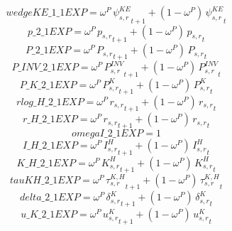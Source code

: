\begin{dmath*}
wedgeKE\_1\_1EXP = {{\omega^{P}}}\, {{\psi^{KE}_{s,r}}}_{t+1}+\left(1-{{\omega^{P}}}\right)\, {{\psi^{KE}_{s,r}}}_{t}
\end{dmath*}
\begin{dmath*}
p\_2\_1EXP = {{\omega^{P}}}\, {{p_{s,r}}}_{t+1}+\left(1-{{\omega^{P}}}\right)\, {{p_{s,r}}}_{t}
\end{dmath*}
\begin{dmath*}
P\_2\_1EXP = {{\omega^{P}}}\, {{P_{s,r}}}_{t+1}+\left(1-{{\omega^{P}}}\right)\, {{P_{s,r}}}_{t}
\end{dmath*}
\begin{dmath*}
P\_INV\_2\_1EXP = {{\omega^{P}}}\, {{P^{INV}_{s,r}}}_{t+1}+\left(1-{{\omega^{P}}}\right)\, {{P^{INV}_{s,r}}}_{t}
\end{dmath*}
\begin{dmath*}
P\_K\_2\_1EXP = {{\omega^{P}}}\, {{P^K_{s,r}}}_{t+1}+\left(1-{{\omega^{P}}}\right)\, {{P^K_{s,r}}}_{t}
\end{dmath*}
\begin{dmath*}
rlog\_H\_2\_1EXP = {{\omega^{P}}}\, {{r_{s,r}}}_{t+1}+\left(1-{{\omega^{P}}}\right)\, {{r_{s,r}}}_{t}
\end{dmath*}
\begin{dmath*}
r\_H\_2\_1EXP = {{\omega^{P}}}\, {{r_{s,r}}}_{t+1}+\left(1-{{\omega^{P}}}\right)\, {{r_{s,r}}}_{t}
\end{dmath*}
\begin{dmath*}
omegaI\_2\_1EXP = 1
\end{dmath*}
\begin{dmath*}
I\_H\_2\_1EXP = {{\omega^{P}}}\, {{I^H_{s,r}}}_{t+1}+\left(1-{{\omega^{P}}}\right)\, {{I^H_{s,r}}}_{t}
\end{dmath*}
\begin{dmath*}
K\_H\_2\_1EXP = {{\omega^{P}}}\, {{K^H_{s,r}}}_{t+1}+\left(1-{{\omega^{P}}}\right)\, {{K^H_{s,r}}}_{t}
\end{dmath*}
\begin{dmath*}
tauKH\_2\_1EXP = {{\omega^{P}}}\, {{\tau^{K,H}_{s,r}}}_{t+1}+\left(1-{{\omega^{P}}}\right)\, {{\tau^{K,H}_{s,r}}}_{t}
\end{dmath*}
\begin{dmath*}
delta\_2\_1EXP = {{\omega^{P}}}\, {{\delta^{K}_{s,r}}}_{t+1}+\left(1-{{\omega^{P}}}\right)\, {{\delta^{K}_{s,r}}}_{t}
\end{dmath*}
\begin{dmath*}
u\_K\_2\_1EXP = {{\omega^{P}}}\, {{u^K_{s,r}}}_{t+1}+\left(1-{{\omega^{P}}}\right)\, {{u^K_{s,r}}}_{t}
\end{dmath*}

